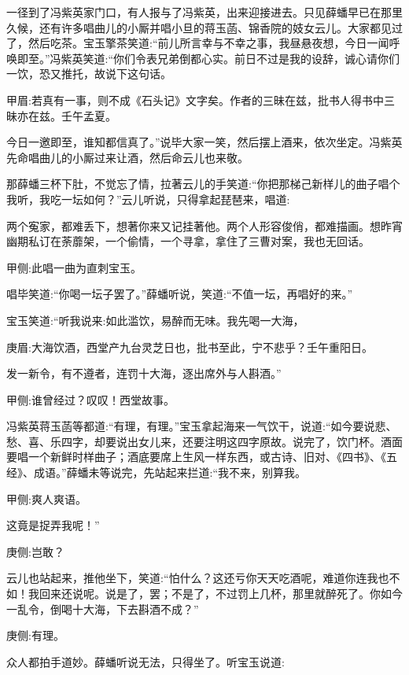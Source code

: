 \begin{parag}
    一径到了冯紫英家门口，有人报与了冯紫英，出来迎接进去。只见薛蟠早已在那里久候，还有许多唱曲儿的小厮并唱小旦的蒋玉菡、锦香院的妓女云儿。大家都见过了，然后吃茶。宝玉擎茶笑道:“前儿所言幸与不幸之事，我昼悬夜想，今日一闻呼唤即至。”冯紫英笑道:“你们令表兄弟倒都心实。前日不过是我的设辞，诚心请你们一饮，恐又推托，故说下这句话。\begin{note}甲眉:若真有一事，则不成《石头记》文字矣。作者的三昧在兹，批书人得书中三昧亦在兹。壬午孟夏。\end{note}今日一邀即至，谁知都信真了。”说毕大家一笑，然后摆上酒来，依次坐定。冯紫英先命唱曲儿的小厮过来让酒，然后命云儿也来敬。
\end{parag}


\begin{parag}
    那薛蟠三杯下肚，不觉忘了情，拉著云儿的手笑道:“你把那梯己新样儿的曲子唱个我听，我吃一坛如何？”云儿听说，只得拿起琵琶来，唱道:
\end{parag}


\begin{parag}
    两个寃家，都难丢下，想著你来又记挂著他。两个人形容俊俏，都难描画。想昨宵幽期私订在荼蘼架，一个偷情，一个寻拿，拿住了三曹对案，我也无回话。\begin{note}甲侧:此唱一曲为直刺宝玉。\end{note}
\end{parag}


\begin{parag}
    唱毕笑道:“你喝一坛子罢了。”薛蟠听说，笑道:“不值一坛，再唱好的来。”
\end{parag}


\begin{parag}
    宝玉笑道:“听我说来:如此滥饮，易醉而无味。我先喝一大海，\begin{note}庚眉:大海饮酒，西堂产九台灵芝日也，批书至此，宁不悲乎？壬午重阳日。\end{note}发一新令，有不遵者，连罚十大海，逐出席外与人斟酒。”\begin{note}甲侧:谁曾经过？叹叹！西堂故事。\end{note}冯紫英蒋玉菡等都道:“有理，有理。”宝玉拿起海来一气饮干，说道:“如今要说悲、愁、喜、乐四字，却要说出女儿来，还要注明这四字原故。说完了，饮门杯。酒面要唱一个新鲜时样曲子；酒底要席上生风一样东西，或古诗、旧对、《四书》、《五经》、成语。”薛蟠未等说完，先站起来拦道:“我不来，别算我。\begin{note}甲侧:爽人爽语。\end{note}这竟是捉弄我呢！”\begin{note}庚侧:岂敢？\end{note}云儿也站起来，推他坐下，笑道:“怕什么？这还亏你天天吃酒呢，难道你连我也不如！我回来还说呢。说是了，罢；不是了，不过罚上几杯，那里就醉死了。你如今一乱令，倒喝十大海，下去斟酒不成？”\begin{note}庚侧:有理。\end{note}众人都拍手道妙。薛蟠听说无法，只得坐了。听宝玉说道:
\end{parag}


